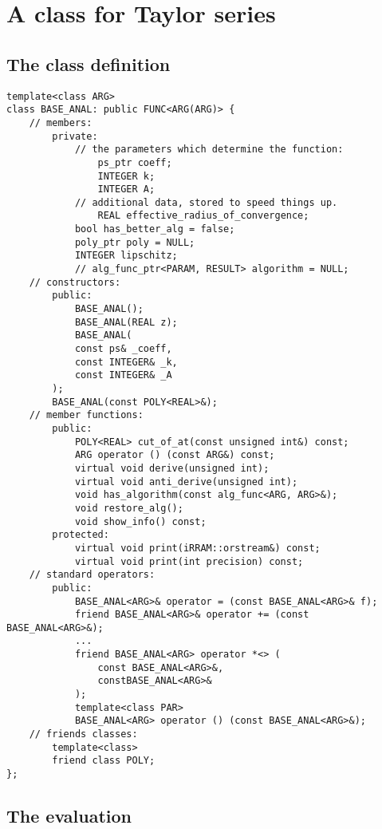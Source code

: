\section{A class for Taylor series}


\subsection{The class definition}

\begin{lstlisting}
template<class ARG>
class BASE_ANAL: public FUNC<ARG(ARG)> {
	// members:
		private:
			// the parameters which determine the function:
	  			ps_ptr coeff;
	  			INTEGER k;
	  			INTEGER A;
			// additional data, stored to speed things up.
	  			REAL effective_radius_of_convergence;
			bool has_better_alg = false;
			poly_ptr poly = NULL;
			INTEGER lipschitz;
			// alg_func_ptr<PARAM, RESULT> algorithm = NULL;
	// constructors:
		public:
			BASE_ANAL();
			BASE_ANAL(REAL z);
			BASE_ANAL(
			const ps& _coeff,
			const INTEGER& _k,
			const INTEGER& _A
		);
		BASE_ANAL(const POLY<REAL>&);
	// member functions:
		public:
			POLY<REAL> cut_of_at(const unsigned int&) const;
			ARG operator () (const ARG&) const;
			virtual void derive(unsigned int);
			virtual void anti_derive(unsigned int);
			void has_algorithm(const alg_func<ARG, ARG>&);
			void restore_alg();
			void show_info() const;
		protected:
			virtual void print(iRRAM::orstream&) const;
			virtual void print(int precision) const;
 	// standard operators:
		public:
			BASE_ANAL<ARG>& operator = (const BASE_ANAL<ARG>& f);
			friend BASE_ANAL<ARG>& operator += (const BASE_ANAL<ARG>&);
			...
			friend BASE_ANAL<ARG> operator *<> (
				const BASE_ANAL<ARG>&,
				constBASE_ANAL<ARG>&
			);
			template<class PAR>
			BASE_ANAL<ARG> operator () (const BASE_ANAL<ARG>&);
  	// friends classes:
   		template<class>
   		friend class POLY;
};
\end{lstlisting}

\subsection{The evaluation}
